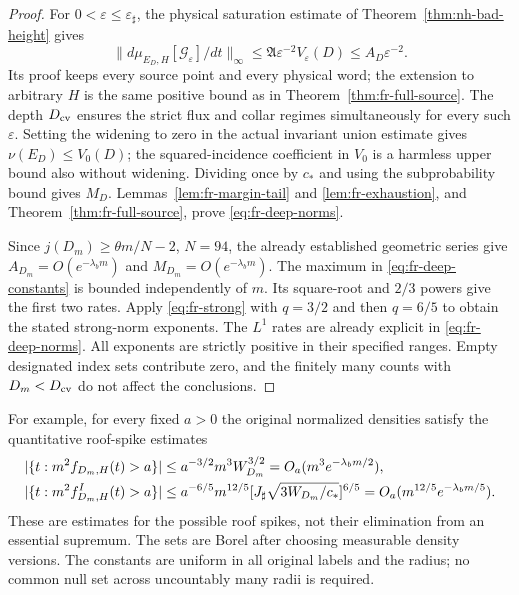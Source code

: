 \begin{proof}
For $0<\varepsilon\le\varepsilon_\sharp$, the physical saturation
estimate of Theorem~\ref{thm:nh-bad-height} gives
\[
 \|d\mu_{E_D,H}[\mathcal G_\varepsilon]/dt\|_\infty
 \le\mathfrak A\varepsilon^{-2}V_\varepsilon(D)
 \le A_D\varepsilon^{-2}.
\]
Its proof keeps every source point and every physical word; the
extension to arbitrary $H$ is the same positive bound as in
Theorem~\ref{thm:fr-full-source}.  The depth $D_{\rm cv}$ ensures
the strict flux and collar regimes simultaneously for every such
$\varepsilon$.  Setting the widening to zero in the actual invariant
union estimate gives $\nu(E_D)\le V_0(D)$; the squared-incidence
coefficient in $V_0$ is a harmless upper bound also without widening.
Dividing once by $c_*$ and using the subprobability bound gives $M_D$.
Lemmas~\ref{lem:fr-margin-tail} and \ref{lem:fr-exhaustion}, and
Theorem~\ref{thm:fr-full-source}, prove \eqref{eq:fr-deep-norms}.

Since $j(D_m)\ge\theta m/N-2$, $N=94$, the already established
geometric series give
$A_{D_m}=O(e^{-\lambda_bm})$ and
$M_{D_m}=O(e^{-\lambda_bm})$.  The maximum in
\eqref{eq:fr-deep-constants} is bounded independently of $m$.
Its square-root and $2/3$ powers give the first two rates.
Apply \eqref{eq:fr-strong} with $q=3/2$ and then $q=6/5$ to
obtain the stated strong-norm exponents.  The $L^1$ rates are
already explicit in \eqref{eq:fr-deep-norms}.  All exponents are
strictly positive in their specified ranges.  Empty designated
index sets contribute zero, and the finitely many counts with
$D_m<D_{\rm cv}$ do not affect the conclusions.
\end{proof}

For example, for every fixed $a>0$ the original normalized densities
satisfy the quantitative roof-spike estimates
\begin{align}\label{eq:fr-spikes}
 |\{t:m^2f_{D_m,H}(t)>a\}|
   &\le a^{-3/2}m^3 W_{D_m}^{3/2}
           =O_a(m^3e^{-\lambda_bm/2}),\notag\\
 |\{t:m^2f^I_{D_m,H}(t)>a\}|
   &\le a^{-6/5}m^{12/5}
           [J_\sharp\sqrt{3W_{D_m}/c_*}]^{6/5}
           =O_a(m^{12/5}e^{-\lambda_bm/5}).
\end{align}
These are estimates for the possible roof spikes, not their
elimination from an essential supremum.  The sets are Borel after
choosing measurable density versions.  The constants are uniform
in all original labels and the radius; no common null set across
uncountably many radii is required.

